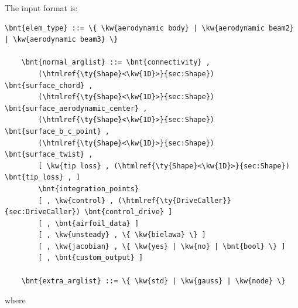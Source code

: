 The input format is:
\begin{Verbatim}[commandchars=\\\{\}]
    \bnt{elem_type} ::= \{ \kw{aerodynamic body} | \kw{aerodynamic beam2} | \kw{aerodynamic beam3} \}

    \bnt{normal_arglist} ::= \bnt{connectivity} ,
        (\htmlref{\ty{Shape}<\kw{1D}>}{sec:Shape})          \bnt{surface_chord} ,
        (\htmlref{\ty{Shape}<\kw{1D}>}{sec:Shape})          \bnt{surface_aerodynamic_center} ,
        (\htmlref{\ty{Shape}<\kw{1D}>}{sec:Shape})          \bnt{surface_b_c_point} ,
        (\htmlref{\ty{Shape}<\kw{1D}>}{sec:Shape})          \bnt{surface_twist} ,
        [ \kw{tip loss} , (\htmlref{\ty{Shape}<\kw{1D}>}{sec:Shape}) \bnt{tip_loss} , ]
        \bnt{integration_points}
        [ , \kw{control} , (\htmlref{\ty{DriveCaller}}{sec:DriveCaller}) \bnt{control_drive} ] 
        [ , \bnt{airfoil_data} ]
        [ , \kw{unsteady} , \{ \kw{bielawa} \} ]
        [ , \kw{jacobian} , \{ \kw{yes} | \kw{no} | \bnt{bool} \} ]
        [ , \bnt{custom_output} ]

    \bnt{extra_arglist} ::= \{ \kw{std} | \kw{gauss} | \kw{node} \}
\end{Verbatim}
where
